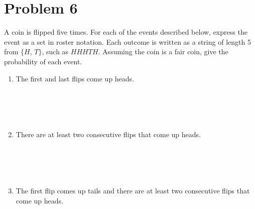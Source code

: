 \documentclass{amsart}
\theoremstyle{definition}
\theoremstyle{Exercise}
\theoremstyle{remark}
\theoremstyle{rule}
\numberwithin{equation}{section}
\begin{document}
\section*{Problem 6}
A coin is flipped five times. For each of the events described below, express the event as a set in roster notation. Each outcome is written as a string of length 5 from $\{H,\, T\}$, such as $HHHTH$. Assuming the coin is a fair coin, give the probability of each event.\\
\begin{enumerate}[label=(\alph*)]
\item The first and last flips come up heads.\\\\\
\\\\\
\item There are at least two consecutive flips that come up heads.\\\\\
\\\\\
\item The first flip comes up tails and there are at least two consecutive flips that come up heads.\\\\\
\\\\\
\end{enumerate}

 \newpage
\end{document}
